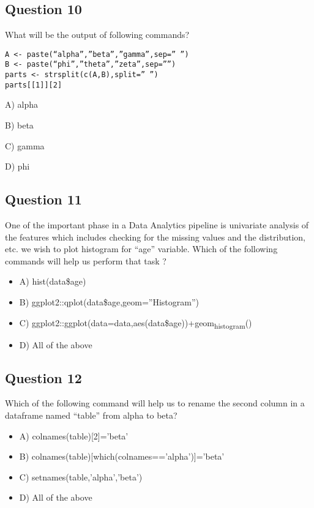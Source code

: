 \documentclass[11pt]{article}
\begin{document}
\subsection*{Question 10}
\label{sec:org6dd2521}
What will be the output of following commands?

\begin{verbatim}
A <- paste(“alpha”,”beta”,”gamma”,sep=” ”)
B <- paste(“phi”,”theta”,”zeta”,sep=””)
parts <- strsplit(c(A,B),split=” ”)
parts[[1]][2]
\end{verbatim}

A) alpha

B) beta

C) gamma

D) phi

\subsection*{Question 11}
\label{sec:org3529163}
One of the important phase in a Data Analytics pipeline is univariate analysis
of the features which includes checking for the missing values and the
distribution, etc. we wish to plot histogram for “age”
variable. Which of the following commands will help us perform that task ? 

\begin{itemize}
\item A) hist(data\$age)

\item B) ggplot2::qplot(data\$age,geom=”Histogram”)

\item C) ggplot2::ggplot(data=data,aes(data\$age))+geom\textsubscript{histogram}()

\item D) All of the above
\end{itemize}

\subsection*{Question 12}
\label{sec:orgf2a9889}
Which of the following command will help us to rename the second column in a dataframe named “table” from alpha to beta?

\begin{itemize}
\item A) colnames(table)[2]=’beta’

\item B) colnames(table)[which(colnames==’alpha’)]=’beta’

\item C) setnames(table,’alpha’,’beta’)

\item D) All of the above
\end{itemize}
\end{document}
